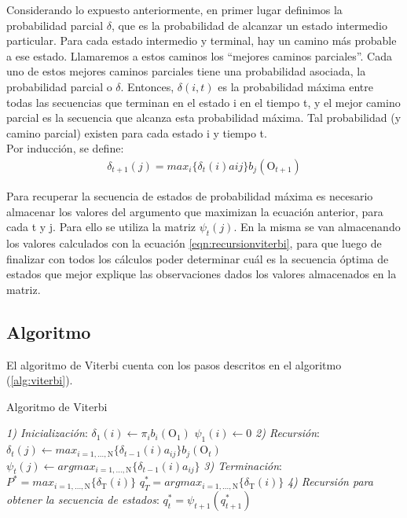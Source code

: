 Considerando lo expuesto anteriormente, en primer lugar definimos la probabilidad parcial $\delta$, que es la probabilidad de alcanzar un estado intermedio particular. Para cada estado intermedio y terminal, hay un camino más probable a ese estado. Llamaremos a estos caminos los \enquote{mejores caminos parciales}. Cada uno de estos mejores caminos parciales tiene una probabilidad asociada, la probabilidad parcial o $\delta$. Entonces, $\delta(i, t)$ es la probabilidad máxima entre todas las secuencias que terminan en el estado i en el tiempo t, y el mejor camino parcial es la secuencia que alcanza esta probabilidad máxima. Tal probabilidad (y camino parcial) existen para cada estado i y tiempo t.\\
Por inducción, se define:
\begin{align}
\delta_{t+1}(j)=max_i\{\delta_t(i)a{ij}\}b_j(\mathrm{O}_{t+1})
\label{eqn:recursionviterbi}
\end{align}


Para recuperar la secuencia de estados de probabilidad máxima es necesario almacenar los valores del argumento que maximizan la ecuación anterior, para cada t y j. Para ello se utiliza la matriz $\psi_t(j)$. En la misma se van almacenando los valores calculados con la ecuación \ref{eqn:recursionviterbi}, para que luego de finalizar con todos los cálculos poder determinar cuál es la secuencia óptima de estados que mejor explique las observaciones dados los valores almacenados en la matriz.


\subsection{Algoritmo}
El algoritmo de Viterbi cuenta con los pasos descritos en el algoritmo (\ref{alg:viterbi}).

\begin{algorithm}
\caption{Algoritmo de Viterbi}\label{alg:viterbi}
\begin{algorithmic}[1]
\BState \emph{1) Inicialización}:
\State $\delta_1(i) \gets \pi_ib_i(\mathrm{O}_1)$ 
\State $\psi_1(i) \gets 0$
\BState \emph{2) Recursión}:
\State $\delta_t(j) \gets max_{i=1,...,\mathrm{N}} \{ \delta_{t-1}(i)a_{ij}\}b_j(\mathrm{O}_t)$ 
\State $\psi_t(j) \gets argmax_{i=1,...,\mathrm{N}}\{\delta_{t-1}(i)a_{ij}\} $ 
\BState \emph{3) Terminación}:
\State $P^*=max_{i=1,...,\mathrm{N}}\{\delta_\mathrm{T}(i)\}$
\State $q_T^*=argmax_{i=1,...,\mathrm{N}}\{\delta_\mathrm{T}(i)\}$
\BState \emph{4) Recursión para obtener la secuencia de estados}:
\State $q_t^*=\psi_{t+1}(q_{t+1}^*)$ 
\EndProcedure
\end{algorithmic}
\end{algorithm}

